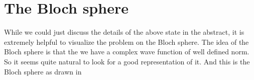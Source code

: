 \section{The Bloch sphere}

While we could just discuss the details of the above state in the abstract, it is extremely helpful to visualize the problem on the Bloch sphere. The idea of the Bloch sphere is that the we have a complex wave function of well defined norm. So it seems quite natural to look for a good representation of it. And this is the Bloch sphere as drawn in 